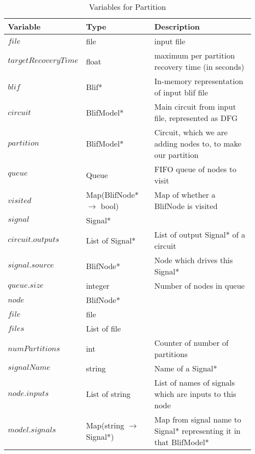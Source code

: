 \documentclass[12pt,final,oneside]{article} %
\begin{document}
\begin{table}
    \begin{center}
        \begin{tabularx}{\linewidth}{llX}
        \toprule
        Variable & Type & Description\\
        \midrule
        $file$ & file  & input file\\
        $targetRecoveryTime$ & float & maximum per partition recovery time (in seconds)\\
        $blif$ & Blif* & In-memory representation of input blif file\\
        $circuit$ &  BlifModel* & Main circuit from input file, represented as DFG\\
        $partition$ &  BlifModel* & Circuit, which we are adding nodes to, to make our partition\\
        $queue$ & Queue & FIFO queue of nodes to visit\\
        $visited$ &  Map(BlifNode*$\to$ bool)& Map of whether a BlifNode is visited\\
        $signal$ & Signal* & \\
        $circuit.outputs$ & List of Signal* & List of output Signal* of a circuit\\
        $signal.source$ & BlifNode* & Node which drives this Signal*\\
        $queue.size$ & integer & Number of nodes in queue\\
        $node$ & BlifNode* & \\
        $file$ & file & \\
        $files$ & List of file & \\
        $numPartitions$ & int & Counter of number of partitions\\
        $signalName$ & string & Name of a Signal*\\
        $node.inputs$ & List of string & List of names of signals which are inputs to this node\\
        $model.signals$ & Map(string $\to$ Signal*) & Map from signal name to Signal* representing it in that BlifModel*\\
        \bottomrule
        \end{tabularx}
        \caption{Variables for Partition}
        \label{varPart}
    \end{center}
\end{table}
\end{document}

